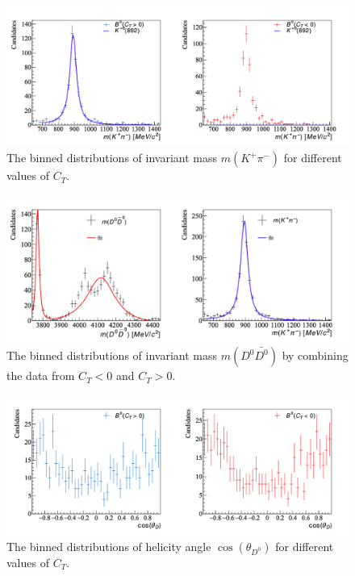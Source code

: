 \begin{figure}[h]
\center
\includegraphics*[width=0.96\linewidth]{CM_variables_B0/B0_invmass_KpPim_fit_1000}
\caption{The binned distributions of invariant mass $m(K^+\pi^-)$ for different values of $C_T$.}
\label{invkpiv2}
\end{figure}

\begin{figure}[h]
\center
\includegraphics*[width=0.96\linewidth]{CM_variables_B0/B0_invariant_mass_fit_1000}
\caption{The binned distributions of invariant mass $m(D^0\bar{D^0})$ by combining the data from $C_T<0$ and $C_T>0$.}
\label{invfit2}
\end{figure}

\begin{figure}[h]
\center
\includegraphics*[width=0.96\linewidth]{CM_variables_B0/B0_helangle_D0Dbar0_1000}
\caption{The binned distributions of helicity angle $\cos(\theta_{D^0})$ for different values of $C_T$.}
\label{thetaddv2}
\end{figure}

